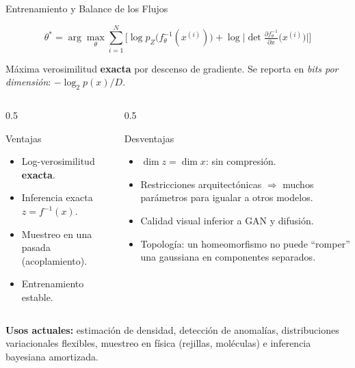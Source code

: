 \documentclass[aspectratio=169, 10pt]{beamer}
\newcommand{\formula}[1]{%
	\begin{tcolorbox}[colback=UCMBlue!8, colframe=UCMBlue, arc=4pt,
		boxsep=2pt, left=6pt, right=6pt, top=3pt, bottom=3pt]
		#1
	\end{tcolorbox}
}
\begin{document}
\begin{frame}[shrink]{Entrenamiento y Balance de los Flujos}

	\formula{
		\[
		\theta^* = \arg\max_\theta \sum_{i=1}^N \Big[\log p_Z\big(f_\theta^{-1}(x^{(i)})\big) + \log\Big|\det \tfrac{\partial f_\theta^{-1}}{\partial x}\big(x^{(i)}\big)\Big|\Big]
		\]
	}

	\small M\'axima verosimilitud \textbf{exacta} por descenso de gradiente. Se reporta en \textit{bits por dimensi\'on}: $-\log_2 p(x)/D$.

	\vspace{0.3cm}

	\begin{columns}[T]
		\begin{column}{0.5\textwidth}
			\begin{block}{Ventajas}
				\small
				\begin{itemize}
					\item Log-verosimilitud \textbf{exacta}.
					\item Inferencia exacta $z = f^{-1}(x)$.
					\item Muestreo en una pasada (acoplamiento).
					\item Entrenamiento estable.
				\end{itemize}
			\end{block}
		\end{column}

		\begin{column}{0.5\textwidth}
			\begin{alertblock}{Desventajas}
				\small
				\begin{itemize}
					\item $\dim z = \dim x$: sin compresi\'on.
					\item Restricciones arquitect\'onicas $\Rightarrow$ muchos par\'ametros para igualar a otros modelos.
					\item Calidad visual inferior a GAN y difusi\'on.
					\item Topolog\'ia: un homeomorfismo no puede ``romper'' una gaussiana en componentes separados.
				\end{itemize}
			\end{alertblock}
		\end{column}
	\end{columns}

	\vspace{0.2cm}

	\small \textbf{Usos actuales:} estimaci\'on de densidad, detecci\'on de anomal\'ias, distribuciones variacionales flexibles, muestreo en f\'isica (rejillas, mol\'eculas) e inferencia bayesiana amortizada.

\end{frame}
\end{document}
